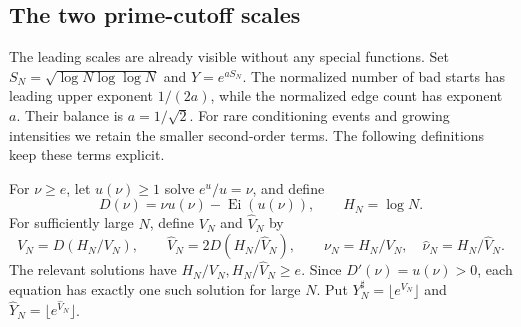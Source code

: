 \subsection{The two prime-cutoff scales}\label{sec:cutoff-definition}
The leading scales are already visible without any special functions.
Set $S_N=\sqrt{\log N\log\log N}$ and $Y=e^{aS_N}$. The normalized number of bad
starts has leading upper exponent $1/(2a)$, while the normalized edge count
has exponent $a$. Their balance is $a=1/\sqrt2$.
For rare conditioning events and growing intensities we retain the smaller
second-order terms. The following definitions keep these terms explicit.

For $\nu\ge e$, let $u(\nu)\ge1$ solve $e^{u}/u=\nu$, and define
\[
 D(\nu)=\nu u(\nu)-\operatorname{Ei}(u(\nu)),\qquad
 H_N=\log N.
\]
For sufficiently large $N$, define $V_N$ and $\widehat V_N$ by
\begin{equation}\label{eq:saddle-definitions}
 V_N=D(H_N/V_N),\qquad
 \widehat V_N=2D(H_N/\widehat V_N),
 \qquad \nu_N=H_N/V_N,\quad\widehat\nu_N=H_N/\widehat V_N.
\end{equation}
The relevant solutions have $H_N/V_N,H_N/\widehat V_N\ge e$.
Since $D'(\nu)=u(\nu)>0$, each equation has exactly one such solution
for large $N$. Put $Y_N^\sharp=\lfloor e^{V_N}\rfloor$ and
$\widehat Y_N=\lfloor e^{\widehat V_N}\rfloor$.

